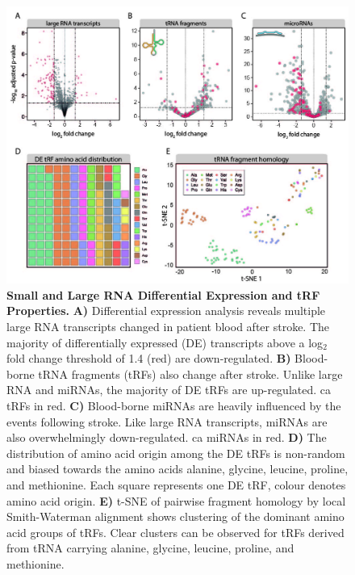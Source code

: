 \begin{figure}[ht]
\includegraphics[width=\textwidth]{figures/stroke-de-tsne}
\caption[Small and Large RNA Differential Expression and tRF Properties.]{\textbf{Small and Large RNA Differential Expression and tRF Properties.} \textbf{A)} Differential expression analysis reveals multiple large RNA transcripts changed in patient blood after stroke. The majority of differentially expressed (DE) transcripts above a log$_2$ fold change threshold of 1.4 (red) are down-regulated. \textbf{B)} Blood-borne tRNA fragments (tRFs) also change after stroke. Unlike large RNA and miRNAs, the majority of DE tRFs are up-regulated. \Acf{ca} tRFs in red. \textbf{C)} Blood-borne miRNAs are heavily influenced by the events following stroke. Like large RNA transcripts, miRNAs are also overwhelmingly down-regulated. \Ac{ca} miRNAs in red. \textbf{D)} The distribution of amino acid origin among the DE tRFs is non-random and biased towards the amino acids alanine, glycine, leucine, proline, and methionine. Each square represents one DE tRF, colour denotes amino acid origin. \textbf{E)} t-SNE of pairwise fragment homology by local Smith-Waterman alignment shows clustering of the dominant amino acid groups of tRFs. Clear clusters can be observed for tRFs derived from tRNA carrying alanine, glycine, leucine, proline, and methionine.
\label{fig:stroke-de-tsne}}
\end{figure}

